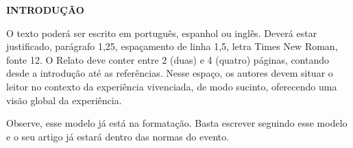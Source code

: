 \begin{OnehalfSpace}

    \noindent\textbf{INTRODUÇÃO}

    O texto poderá ser escrito em português, espanhol ou inglês. Deverá estar justificado, parágrafo 1,25, espaçamento de linha 1,5, letra Times New Roman, fonte 12. O Relato deve conter entre 2 (duas) e 4 (quatro) páginas, contando desde a introdução até as referências. Nesse espaço, os autores devem situar o leitor no contexto da experiência vivenciada, de modo sucinto, oferecendo uma visão global da experiência.

    Observe, esse modelo já está na formatação. Basta escrever seguindo esse modelo e o seu artigo já estará dentro das normas do evento.

\end{OnehalfSpace}